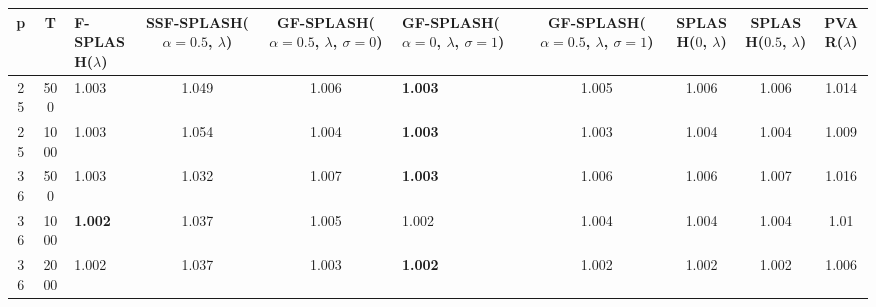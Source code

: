 \begin{tabular}{cclcclcccc}
\hline
  p  &  T   & F-SPLASH($\lambda$)   &  SSF-SPLASH($\alpha=0.5$, $\lambda$)  &  GF-SPLASH($\alpha=0.5$, $\lambda$, $\sigma=0$)  & GF-SPLASH($\alpha=0$, $\lambda$, $\sigma=1$)   &  GF-SPLASH($\alpha=0.5$, $\lambda$, $\sigma=1$)  &  SPLASH($0$, $\lambda$)  &  SPLASH($0.5$, $\lambda$)  &  PVAR($\lambda$)  \\
\hline
 25  & 500  & 1.003                 &                 1.049                 &                      1.006                       & \textbf{1.003}                                 &                      1.005                       &          1.006           &           1.006            &       1.014       \\
 25  & 1000 & 1.003                 &                 1.054                 &                      1.004                       & \textbf{1.003}                                 &                      1.003                       &          1.004           &           1.004            &       1.009       \\
 36  & 500  & 1.003                 &                 1.032                 &                      1.007                       & \textbf{1.003}                                 &                      1.006                       &          1.006           &           1.007            &       1.016       \\
 36  & 1000 & \textbf{1.002}        &                 1.037                 &                      1.005                       & 1.002                                          &                      1.004                       &          1.004           &           1.004            &       1.01        \\
 36  & 2000 & 1.002                 &                 1.037                 &                      1.003                       & \textbf{1.002}                                 &                      1.002                       &          1.002           &           1.002            &       1.006       \\
\hline
\end{tabular}